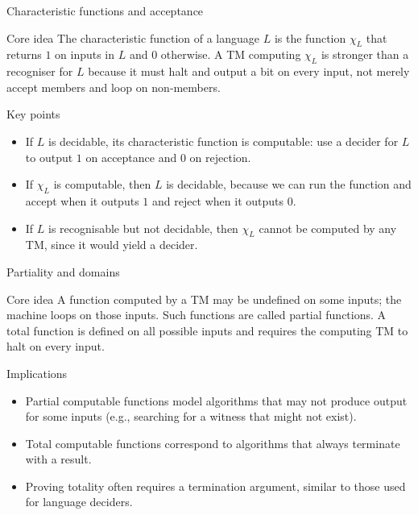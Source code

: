 \begin{frame}[t]{Characteristic functions and acceptance}
  \begin{tblock}{Core idea}
    The characteristic function of a language $L$ is the function
    $\chi_L$ that returns $1$ on inputs in $L$ and $0$ otherwise.  A TM
    computing $\chi_L$ is stronger than a recogniser for $L$ because it
    must halt and output a bit on every input, not merely accept
    members and loop on non‑members.
  \end{tblock}
  \begin{tblock}{Key points}
    \begin{itemize}
      \item If $L$ is decidable, its characteristic function is
        computable: use a decider for $L$ to output $1$ on acceptance
        and $0$ on rejection.
      \item If $\chi_L$ is computable, then $L$ is decidable, because
        we can run the function and accept when it outputs $1$ and
        reject when it outputs $0$.
      \item If $L$ is recognisable but not decidable, then $\chi_L$
        cannot be computed by any TM, since it would yield a decider.
    \end{itemize}
  \end{tblock}
  \label{fr:7.3-09}
\end{frame}

\begin{frame}[t]{Partiality and domains}
  \begin{tblock}{Core idea}
    A function computed by a TM may be undefined on some inputs; the
    machine loops on those inputs.  Such functions are called partial
    functions.  A total function is defined on all possible inputs and
    requires the computing TM to halt on every input.
  \end{tblock}
  \begin{tblock}{Implications}
    \begin{itemize}
      \item Partial computable functions model algorithms that may not
        produce output for some inputs (e.g., searching for a witness that
        might not exist).
      \item Total computable functions correspond to algorithms that
        always terminate with a result.
      \item Proving totality often requires a termination argument,
        similar to those used for language deciders.
    \end{itemize}
  \end{tblock}
  \label{fr:7.3-10}
\end{frame}

